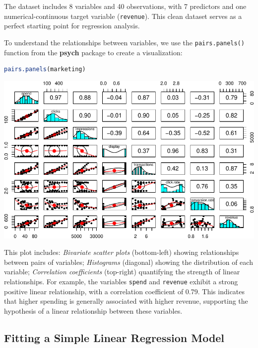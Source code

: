 \documentclass[
]{book}
\newcommand{\passthrough}[1]{#1}
\theoremstyle{definition}
\theoremstyle{definition}
\theoremstyle{definition}
\theoremstyle{definition}
\theoremstyle{remark}
\begin{document}
The dataset includes 8 variables and 40 observations, with 7 predictors and one numerical-continuous target variable (\passthrough{\lstinline!revenue!}). This clean dataset serves as a perfect starting point for regression analysis.

To understand the relationships between variables, we use the \passthrough{\lstinline!pairs.panels()!} function from the \textbf{psych} package to create a visualization:

\begin{lstlisting}[language=R]
pairs.panels(marketing)
\end{lstlisting}

\begin{center}\includegraphics[width=1\linewidth]{regression_files/figure-latex/unnamed-chunk-4-1} \end{center}

This plot includes: \emph{Bivariate scatter plots} (bottom-left) showing relationships between pairs of variables; \emph{Histograms} (diagonal) showing the distribution of each variable; \emph{Correlation coefficients} (top-right) quantifying the strength of linear relationships. For example, the variables \passthrough{\lstinline!spend!} and \passthrough{\lstinline!revenue!} exhibit a strong positive linear relationship, with a correlation coefficient of 0.79. This indicates that higher spending is generally associated with higher revenue, supporting the hypothesis of a linear relationship between these variables.

\subsection*{Fitting a Simple Linear Regression Model}\label{fitting-a-simple-linear-regression-model}
\end{document}

